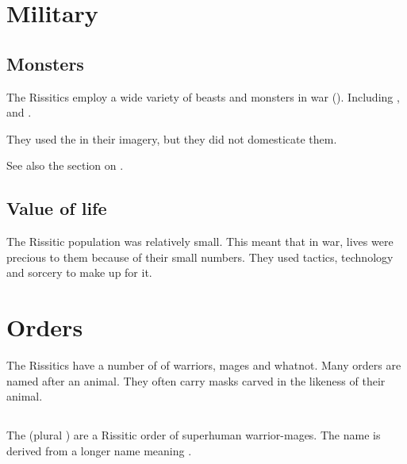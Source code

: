 \section{Military}





\subsection{Monsters}
The Rissitics employ a wide variety of beasts and monsters in war ().
Including \lothae, \mezolisks and \corgoroth. 

They used the  in their imagery, but they did not domesticate them. 

See also the section on . 





\subsection{Value of life}
The Rissitic population was relatively small. 
This meant that in war, lives were precious to them because of their small numbers.
They used tactics, technology and sorcery to make up for it.















\section{Orders}
The Rissitics have a number of  of warriors, mages and whatnot. 
Many orders are named after an animal. 
They often carry masks carved in the likeness of their animal. 





\subsection{\Ashenoch}
The \Ashenoch{} (plural \Ashenoch) are a Rissitic order of superhuman warrior-mages. 
The name is derived from a longer name meaning . 


